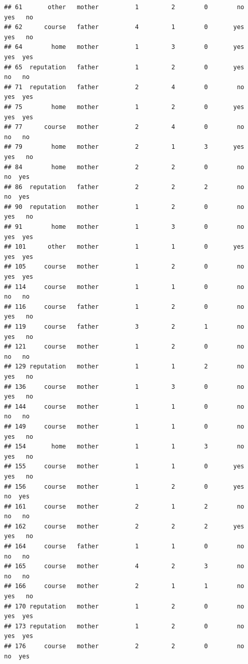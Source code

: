 \documentclass[
]{article}
\begin{document}
\begin{verbatim}
## 61       other   mother          1         2        0        no    yes   no
## 62      course   father          4         1        0       yes    yes   no
## 64        home   mother          1         3        0       yes    yes  yes
## 65  reputation   father          1         2        0       yes     no   no
## 71  reputation   father          2         4        0        no    yes  yes
## 75        home   mother          1         2        0       yes    yes  yes
## 77      course   mother          2         4        0        no     no   no
## 79        home   mother          2         1        3       yes    yes   no
## 84        home   mother          2         2        0        no     no  yes
## 86  reputation   father          2         2        2        no     no  yes
## 90  reputation   mother          1         2        0        no    yes   no
## 91        home   mother          1         3        0        no    yes  yes
## 101      other   mother          1         1        0       yes    yes  yes
## 105     course   mother          1         2        0        no    yes  yes
## 114     course   mother          1         1        0        no     no   no
## 116     course   father          1         2        0        no    yes   no
## 119     course   father          3         2        1        no    yes   no
## 121     course   mother          1         2        0        no     no   no
## 129 reputation   mother          1         1        2        no    yes   no
## 136     course   mother          1         3        0        no    yes   no
## 144     course   mother          1         1        0        no     no   no
## 149     course   mother          1         1        0        no    yes   no
## 154       home   mother          1         1        3        no    yes   no
## 155     course   mother          1         1        0       yes    yes   no
## 156     course   mother          1         2        0       yes     no  yes
## 161     course   mother          2         1        2        no     no   no
## 162     course   mother          2         2        2       yes    yes   no
## 164     course   father          1         1        0        no     no   no
## 165     course   mother          4         2        3        no     no   no
## 166     course   mother          2         1        1        no    yes   no
## 170 reputation   mother          1         2        0        no    yes  yes
## 173 reputation   mother          1         2        0        no    yes  yes
## 176     course   mother          2         2        0        no     no  yes

\end{verbatim}
\end{document}
